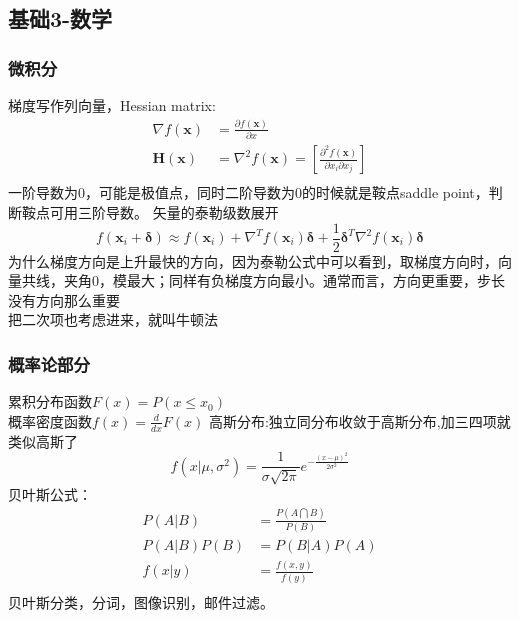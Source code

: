 \documentclass[UTF8]{../computerUniverse}
\begin{document}
\subsection{基础3-数学}

\subsubsection{微积分}
梯度写作列向量，Hessian matrix: 
\begin{equation}
\begin{split}
 \nabla f(\mathbf x)&= \frac{\partial f(\mathbf x)}{\partial x}\\
\mathbf H (\mathbf x)&= \nabla ^2 f(\mathbf x)=\left[ \frac{\partial ^2 f(\mathbf x)}{\partial x_i \partial x_j} \right]\\
\end{split}
\end{equation}
 一阶导数为0，可能是极值点，同时二阶导数为0的时候就是鞍点saddle point，判断鞍点可用三阶导数。
矢量的泰勒级数展开
\begin{equation}
f(\mathbf x_i +\mathbf \delta) \approx f(\mathbf x_i)+
\nabla ^T f(\mathbf x_i) \mathbf \delta +
\frac{1}{2}\mathbf \delta ^T \nabla ^2 f(\mathbf x_i)\mathbf \delta
\end{equation}
为什么梯度方向是上升最快的方向，因为泰勒公式中可以看到，取梯度方向时，向量共线，夹角0，模最大；同样有负梯度方向最小。通常而言，方向更重要，步长没有方向那么重要\\
把二次项也考虑进来，就叫牛顿法

\subsubsection{概率论部分}
累积分布函数$F(x)=P(x \leqslant x_0)$\\
概率密度函数$f(x)=\frac{d}{dx}F(x)$
高斯分布:独立同分布收敛于高斯分布,加三四项就类似高斯了
\begin{equation}
f(x| \mu ,\sigma^2)= \frac{1}{\sigma \sqrt{2\pi}}e^{-\frac{(x-\mu)^2}{2\sigma^2}}
\end{equation}
贝叶斯公式：
\begin{equation}
\begin{split}
    P(A|B) &= \frac{P(A \bigcap B )}{P(B)}\\
    P(A|B) P(B)&= P(B|A) P(A)  \\
    f(x|y) &= \frac{f(x,y)}{f(y)}\\
\end{split}
\end{equation}
贝叶斯分类，分词，图像识别，邮件过滤。
\end{document}
